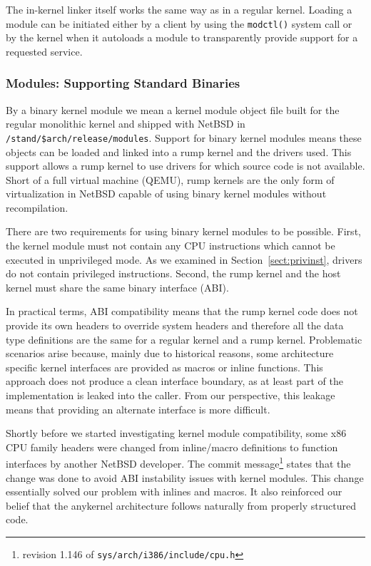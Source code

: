 The in-kernel linker itself works the same way as in a regular kernel.
Loading a module can be initiated either by a client by using the
\texttt{modctl()} system call or by the kernel when it autoloads
a module to transparently provide support for a requested service.

\subsubsection{Modules: Supporting Standard Binaries}
\label{sect:abicompat}

By a binary kernel module we mean a kernel module object file
built for the regular monolithic kernel and shipped with NetBSD in
\verb+/stand/$arch/release/modules+.  Support for binary kernel
modules means these objects can be loaded and linked into a rump
kernel and the drivers used.  This support allows a
rump kernel to use drivers for which source code is not
available.  Short of a full virtual machine (\eg QEMU), rump kernels
are the only form of virtualization in NetBSD capable of using
binary kernel modules without recompilation.

There are two requirements for using binary kernel modules to be possible.
First, the kernel module must not contain any CPU instructions
which cannot be executed in unprivileged mode.  As we examined in
Section~\ref{sect:privinst}, drivers do not contain privileged
instructions.  Second, the rump kernel and the host kernel must share
the same binary interface (ABI).

In practical terms, ABI compatibility means that the rump kernel
code does not provide its own headers to override system headers and therefore
all the data type definitions are the same for a regular kernel
and a rump kernel.  Problematic scenarios arise because, mainly due to historical reasons,
some architecture specific kernel interfaces are provided as macros
or inline functions.  This approach does
not produce a clean interface boundary, as at least part of the
implementation is leaked into the caller.  From our perspective,
this leakage means that providing an alternate interface is more difficult.

Shortly before we started investigating kernel module compatibility,
some x86 CPU family headers were changed from inline/macro definitions
to function interfaces by another NetBSD developer.  The commit message\footnote
{
	revision 1.146 of \texttt{sys/arch/i386/include/cpu.h}
}
states that the change was done to avoid ABI instability issues with
kernel modules.  This change essentially solved our problem with
inlines and macros.  It also
reinforced our belief that the anykernel architecture follows naturally
from properly structured code.

